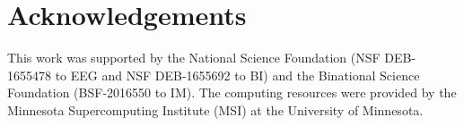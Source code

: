 \documentclass[11pt]{article}
\begin{document}
\section{Acknowledgements}

This work was supported by the National Science Foundation (NSF DEB-1655478 to EEG and NSF DEB-1655692 to BI) and the Binational Science Foundation (BSF-2016550 to IM).
The computing resources were provided by the Minnesota Supercomputing Institute (MSI) at the University of Minnesota.


\clearpage



\setstretch{\stretchby}
\end{document}
